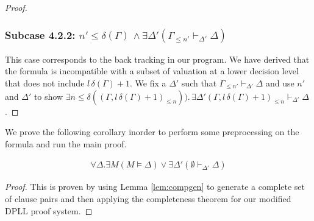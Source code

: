 \begin{mytheorem}
\begin{proof}
\subsubsection*{Subcase 4.2.2: $ n' \leq \delta(\Gamma) \, \wedge  \exists \Delta' ( \Gamma_{ \leq n'}  \vdash_{\Delta'} \Delta)$} 
This case corresponds to the back tracking in our program. We have derived that the formula is incompatible with a subset of valuation at a lower decision level that does not include $l \, \delta(\Gamma) + 1$. We fix a $\Delta'$ such that $\Gamma_{\leq n'} \vdash_{\Delta'} \Delta$ and use $n'$ and $\Delta'$ to show $\exists n \leq \delta((\Gamma, l \, \delta(\Gamma) + 1)_{\leq n})). \, \exists \Delta' (\Gamma, l \, \delta(\Gamma) + 1)_{\leq n} \vdash_{\Delta'} \Delta$.
\end{proof}
\end{mytheorem}
%
We prove the following corollary inorder to perform some preprocessing on the formula and run the main proof. \\
\medskip
\begin{mycorollary}
\begin{align*}
\forall \Delta. \exists M( M \models \Delta) \vee \exists \Delta'(\emptyset \vdash_{\Delta'} \Delta)
\end{align*}
\begin{proof}
This is proven by using Lemma \ref{lem:compgen} to generate a complete set of clause pairs and then applying the completeness theorem for our modified DPLL proof system.
\end{proof}
\end{mycorollary}




